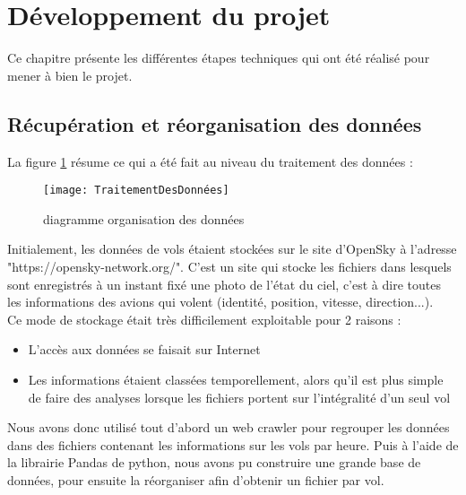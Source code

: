 \chapter*{Développement du projet}
\label{sec:developpement}

Ce chapitre présente les différentes étapes techniques qui ont été réalisé pour mener à bien le projet. 

\section*{Récupération et réorganisation des données}

La figure \ref{fig:traitement_donnees} résume ce qui a été fait au niveau du traitement des données : 

\begin{figure}[!h]
	\centering
	\texttt{[image: TraitementDesDonnées]}
	\caption{diagramme organisation des données}
	\label{fig:traitement_donnees}
\end{figure}


Initialement, les données de vols étaient stockées sur le site d'OpenSky à l'adresse "https://opensky-network.org/". C'est un site qui stocke les fichiers dans lesquels sont enregistrés à un instant fixé une photo de l'état du ciel, c'est à dire toutes les informations des avions qui volent (identité, position, vitesse, direction...). \\

Ce mode de stockage était très difficilement exploitable pour 2 raisons : 

\begin{itemize}
	\item L'accès aux données se faisait sur Internet
	\item Les informations étaient classées temporellement, alors qu'il est plus simple de faire des analyses lorsque les fichiers portent sur l'intégralité d'un seul vol 
\end{itemize}

Nous avons donc utilisé tout d'abord un web crawler pour regrouper les données dans des fichiers contenant les informations sur les vols par heure. Puis à l'aide de la librairie Pandas de python, nous avons pu construire une grande base de données, pour ensuite la réorganiser afin d'obtenir un fichier par vol. \\


